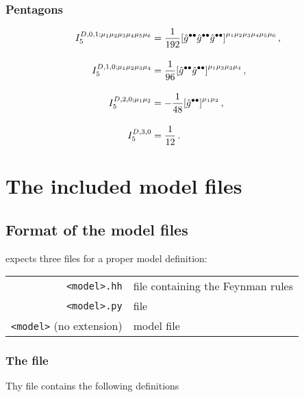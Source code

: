 \subsection*{Pentagons}
\begin{subequations}
\begin{align}
  I_5^{D,0,1;\mu_1\mu_2\mu_3\mu_4\mu_5\mu_6} &= \frac{1}{192}\qty[\hat{g}^{\bullet\bullet}\hat{g}^{\bullet\bullet}\hat{g}^{\bullet\bullet}]^{\mu_1\mu_2\mu_3\mu_4\mu_5\mu_6}\,,\\[10pt]
%
  I_5^{D,1,0;\mu_1\mu_2\mu_3\mu_4} &= \frac{1}{96}\qty[\hat{g}^{\bullet\bullet}\hat{g}^{\bullet\bullet}]^{\mu_1\mu_2\mu_3\mu_4}\,,\\[10pt]
%
  I_5^{D,2,0;\mu_1\mu_2} &= -\frac{1}{48}\qty[\hat{g}^{\bullet\bullet}]^{\mu_1\mu_2}\,,\\[10pt]
%
  I_5^{D,3,0} &= \frac{1}{12}\,.
\end{align}
\end{subequations}

\chapter{The included model files}
\label{chp:model-files}

\section{Format of the model files}\label{sec:modelfiles}
\gosamv{} expects three files for a proper model definition:

\begin{tabular}{r l}
\texttt{<model>.hh} & \form{} file containing the Feynman rules \\
\texttt{<model>.py} & \python{} file \\
\texttt{<model>} (no extension) & \qgraf{} model file \\
\end{tabular}

\subsection{The \python{} file}
Thy \python{} file contains the following definitions

